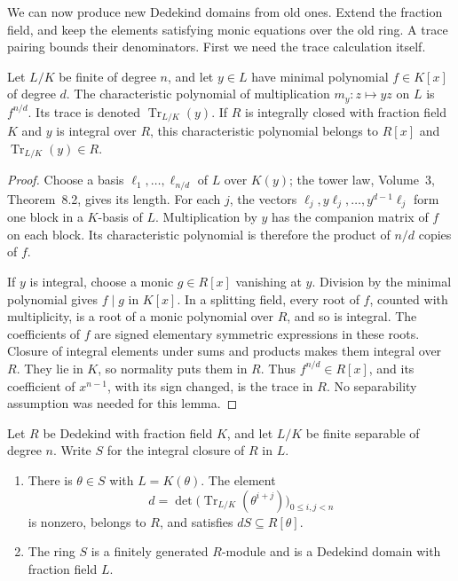We can now produce new Dedekind domains from old ones. Extend the fraction field, and keep the elements satisfying monic equations over the old ring. A trace pairing bounds their denominators. First we need the trace calculation itself.

\begin{lemma}\label{lem:trace}
Let $L/K$ be finite of degree $n$, and let $y\in L$ have minimal polynomial $f\in K[x]$ of degree $d$. The characteristic polynomial of multiplication $m_y\colon z\mapsto yz$ on $L$ is $f^{n/d}$. Its trace is denoted $\operatorname{Tr}_{L/K}(y)$. If $R$ is integrally closed with fraction field $K$ and $y$ is integral over $R$, this characteristic polynomial belongs to $R[x]$ and $\operatorname{Tr}_{L/K}(y)\in R$.
\end{lemma}

\begin{proof}
Choose a basis $\ell_1,\ldots,\ell_{n/d}$ of $L$ over $K(y)$; the tower law, Volume~3, Theorem~8.2, gives its length. For each $j$, the vectors $\ell_j,y\ell_j,\ldots,y^{d-1}\ell_j$ form one block in a $K$-basis of $L$. Multiplication by $y$ has the companion matrix of $f$ on each block. Its characteristic polynomial is therefore the product of $n/d$ copies of $f$.

If $y$ is integral, choose a monic $g\in R[x]$ vanishing at $y$. Division by the minimal polynomial gives $f\mid g$ in $K[x]$. In a splitting field, every root of $f$, counted with multiplicity, is a root of a monic polynomial over $R$, and so is integral. The coefficients of $f$ are signed elementary symmetric expressions in these roots. Closure of integral elements under sums and products makes them integral over $R$. They lie in $K$, so normality puts them in $R$. Thus $f^{n/d}\in R[x]$, and its coefficient of $x^{n-1}$, with its sign changed, is the trace in $R$. No separability assumption was needed for this lemma.
\end{proof}

\begin{theorem}\label{thm:intclosure}
Let $R$ be Dedekind with fraction field $K$, and let $L/K$ be finite separable of degree $n$. Write $S$ for the integral closure of $R$ in $L$.
\begin{enumerate}[label=(\alph*)]
\item There is $\theta\in S$ with $L=K(\theta)$. The element
\[
 d=\det\bigl(\operatorname{Tr}_{L/K}(\theta^{i+j})\bigr)_{0\le i,j<n}
\]
is nonzero, belongs to $R$, and satisfies $dS\subseteq R[\theta]$.
\item The ring $S$ is a finitely generated $R$-module and is a Dedekind domain with fraction field $L$.
\end{enumerate}
\end{theorem}


